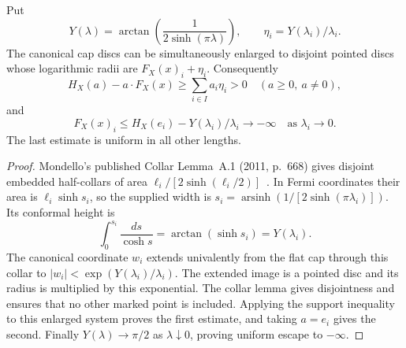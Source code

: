 \begin{proposition}
\label{C:A2b-collar}
Put
\[
 Y(\lambda)=\arctan\!\left(\frac{1}{2\sinh(\pi\lambda)}\right),
 \qquad \eta_i=Y(\lambda_i)/\lambda_i.
\]
The canonical cap discs can be simultaneously enlarged to disjoint pointed discs whose logarithmic radii are $F_X(x)_i+\eta_i$. Consequently
\[
 H_X(a)-a\cdot F_X(x)\geq\sum_{i\in I}a_i\eta_i>0
 \quad(a\geq0,\ a\ne0),
\]
and
\[
 F_X(x)_i\leq H_X(e_i)-Y(\lambda_i)/\lambda_i
        \longrightarrow-\infty\quad\text{as }\lambda_i\to0.
\]
The last estimate is uniform in all other lengths.
\end{proposition}
\begin{proof}
Mondello's published Collar Lemma~A.1 (2011, p.~668) gives disjoint embedded half-collars of area $\ell_i/[2\sinh(\ell_i/2)]$~\cite{C_Mondello2011}. In Fermi coordinates their area is $\ell_i\sinh s_i$, so the supplied width is
$s_i=\operatorname{arsinh}(1/[2\sinh(\pi\lambda_i)])$. Its conformal height is
\[
 \int_0^{s_i}\frac{ds}{\cosh s}
 =\arctan(\sinh s_i)=Y(\lambda_i).
\]
The canonical coordinate $w_i$ extends univalently from the flat cap through this collar to $|w_i|<\exp(Y(\lambda_i)/\lambda_i)$. The extended image is a pointed disc and its radius is multiplied by this exponential. The collar lemma gives disjointness and ensures that no other marked point is included. Applying the support inequality to this enlarged system proves the first estimate, and taking $a=e_i$ gives the second. Finally $Y(\lambda)\to\pi/2$ as $\lambda\downarrow0$, proving uniform escape to $-\infty$.
\end{proof}

